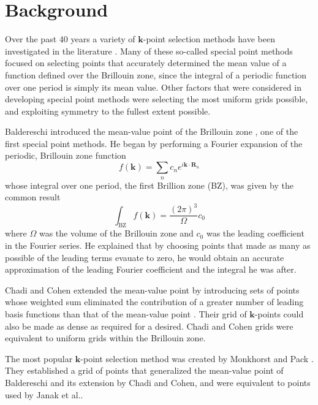 \documentclass[ reprint,
 amsmath,amssymb, aps,
prb,
showpacs ]{revtex4-1}
\begin{document}
\section{Background}

Over the past 40 years a variety of $\mathbf{k}$-point selection
methods have been investigated in the literature
\cite{baldereschi1973mean, chadi1973special, monkhorst1976special,
  froyen1989brillouin, moreno1992optimal, wisesa2016efficient}. Many
of these so-called special point methods focused on selecting points
that accurately determined the mean value of a function defined over
the Brillouin zone, since the integral of a periodic function over one
period is simply its mean value. Other factors that were considered in
developing special point methods were selecting the most uniform grids
possible, and exploiting symmetry to the fullest extent possible.

Baldereschi introduced the mean-value point of the Brillouin zone
\cite{baldereschi1973mean}, one of the first special point methods. He
began by performing a Fourier expansion of the periodic, Brillouin
zone function
\begin{equation}
f(\mathbf{k}) = \sum_n c_n e^{i \mathbf{k} \cdot \mathbf{R}_n}
\end{equation}
whose integral over one period, the first Brillion zone (BZ), was
given by the common result
\begin{equation}
\int_\text{BZ} f(\mathbf{k}) = \frac{(2\pi)^3}{\Omega} c_0
\end{equation}
where $\Omega$ was the volume of the Brillouin zone and $c_0$ was the
leading coefficient in the Fourier series. He explained that by
choosing points that made as many as possible of the leading terms
evauate to zero, he would obtain an accurate approximation of the
leading Fourier coefficient and the integral he was after.

Chadi and Cohen extended the mean-value point by introducing sets of
points whose weighted sum eliminated the contribution of a greater
number of leading basis functions than that of the mean-value point
\cite{chadi1973special}. Their grid of $\mathbf{k}$-points could also
be made as dense as required for a desired. Chadi and Cohen grids were
equivalent to uniform grids within the Brillouin zone.

The most popular $\mathbf{k}$-point selection method was created by
Monkhorst and Pack \cite{monkhorst1976special}. They established a
grid of points that generalized the mean-value point of Baldereschi
and its extension by Chadi and Cohen, and were equivalent to points
used by Janak et al.\cite{janak1971gilat}.
\end{document}

